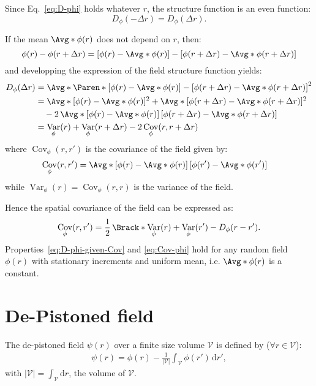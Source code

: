 \documentclass{article}
\DeclareMathOperator{\Var}{Var}
\DeclareMathOperator{\Cov}{Cov}
\begin{document}
Since Eq.~\eqref{eq:D-phi} holds whatever $r$, the structure function is an even function:
\begin{equation}
  \label{eq:D-phi-even}
  D_{\phi}(-\Delta r) =  D_{\phi}(\Delta r).
\end{equation}

If the mean $\Avg*{\phi(r)}$ does not depend on $r$, then:
\begin{displaymath}
  \phi(r) - \phi(r + \Delta r)
  = [\phi(r) - \Avg*{\phi(r)}] - [\phi(r + \Delta r) - \Avg*{\phi(r + \Delta r)}]
\end{displaymath}
and developping the expression of the field structure function yields:
\begin{align}
  D_{\phi}(\Delta r)
  &= \Avg*{\Paren*{[\phi(r) - \Avg*{\phi(r)}] - [\phi(r + \Delta r) - \Avg*{\phi(r + \Delta r)}]}^{2}} \notag \\
  &= \Avg*{[\phi(r) - \Avg*{\phi(r)}]^{2}} + \Avg*{[\phi(r + \Delta r) - \Avg*{\phi(r + \Delta r)}]^{2}}\notag\\
  &\quad  - 2\,\Avg*{[\phi(r) - \Avg*{\phi(r)}]\,[\phi(r + \Delta r) - \Avg*{\phi(r + \Delta r)}]}\notag \\
  &= \Var_{\phi}(r) + \Var_{\phi}(r + \Delta r) - 2 \Cov_{\phi}(r, r + \Delta r)
  \label{eq:D-phi-given-Cov}
\end{align}
where $\Cov_{\phi}(r,r')$ is the covariance of the field given by:
\begin{align}
  \Cov_{\phi}(r,r')
  &= \Avg*{[\phi(r) - \Avg*{\phi(r)}]\,[\phi(r') - \Avg*{\phi(r')}]}
\end{align}
while $\Var_{\phi}(r) = \Cov_{\phi}(r,r)$ is the variance of the field.

Hence the spatial covariance of the field can be expressed as:
\begin{equation}
  \label{eq:Cov-phi}
  \Cov_{\phi}(r,r') = \frac12\,\Brack*{\Var_{\phi}(r) + \Var_{\phi}(r') - D_{\phi}(r - r')}.
\end{equation}
Properties~\eqref{eq:D-phi-given-Cov} and \eqref{eq:Cov-phi} hold for any random field
$\phi(r)$ with stationary increments and uniform mean, i.e. $\Avg*{\phi(r)}$ is a
constant.


\section{De-Pistoned field}
\label{sec:de-pistoned-field}

The de-pistoned field $\psi(r)$ over a finite size volume $\mathcal{V}$ is defined by
($\forall r \in \mathcal{V}$):
\begin{align}
  \psi(r) = \phi(r) - \frac{1}{|\mathcal{V}|} \int_{\mathcal{V}} \phi(r')\,\mathrm{d}r',
\end{align}
with $|\mathcal{V}|=\int_{\mathcal{V}}\mathrm{d}r$, the volume of $\mathcal{V}$.
\end{document}
